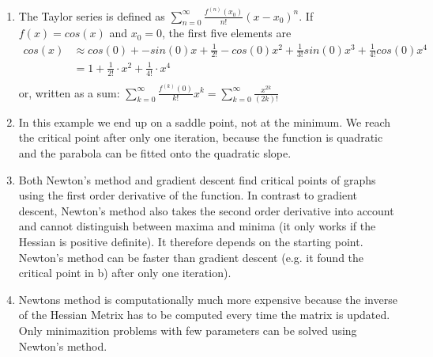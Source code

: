 \begin{solution}
   \begin{enumerate}
       \item The Taylor series is defined as $\sum_{n=0}^\infty \frac{f^{(n)}(x_0)}{n!}(x-x_0)^n$. If $f(x) = cos(x)$ and $x_0 = 0$, the first five elements are
       \begin{equation}
           \begin{split}
               cos(x) & \approx cos(0) + -sin(0)x + \frac{1}{2!}-cos(0)x^2 + \frac{1}{3!}sin(0)x^3 + \frac{1}{4!}cos(0)x^4 \\
               & = 1 + \frac{1}{2!}\cdot x^2 + \frac{1}{4!}\cdot x^4 \\
           \end{split}
       \end{equation}
       or, written as a sum: $\sum_{k=0}^\infty \frac{f^{(k)}(0)}{k!}x^k = \sum_{k=0}^\infty \frac{x^{2k}}{(2k)!}$
       \item In this example we end up on a saddle point, not at the minimum. We reach the critical point after only one iteration, because the function is quadratic and the parabola can be fitted onto the quadratic slope.
       \item Both Newton's method and gradient descent find critical points of graphs using the first order derivative of the function. In contrast to gradient descent, Newton's method also takes the second order derivative into account and cannot distinguish between maxima and minima (it only works if the Hessian is positive definite). It therefore depends on the starting point. Newton's method can be faster than gradient descent (e.g. it found the critical point in b) after only one iteration).
       \item Newtons method is computationally much more expensive because the inverse of the Hessian Metrix has to be computed every time the matrix is updated. Only minimazition problems with few parameters can be solved using Newton's method.
   \end{enumerate}
\end{solution}


